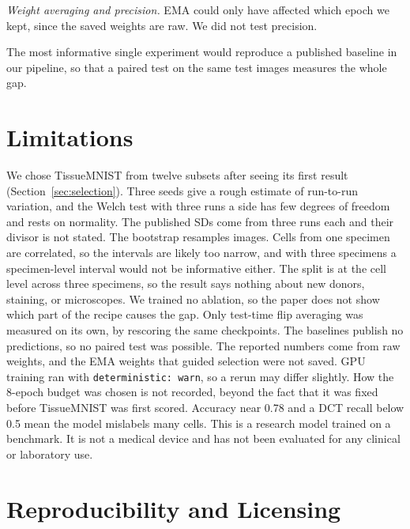 \documentclass[conference]{IEEEtran}
\begin{document}
\emph{Weight averaging and precision.} EMA could only have affected which epoch we kept,
since the saved weights are raw. We did not test precision.

The most informative single experiment would reproduce a published baseline in our
pipeline, so that a paired test on the same test images measures the whole gap.

\section{Limitations}
\label{sec:limits}

We chose TissueMNIST from twelve subsets after seeing its first result
(Section~\ref{sec:selection}). Three seeds give a rough estimate of run-to-run variation,
and the Welch test with three runs a side has few degrees of freedom and rests on
normality. The published SDs come from three runs each and their divisor is not stated.
The bootstrap resamples images. Cells from one specimen are correlated, so the intervals
are likely too narrow, and with three specimens a specimen-level interval would not be
informative either. The split is at the cell level across three specimens, so the result
says nothing about new donors, staining, or microscopes. We trained no ablation, so the paper
does not show which part of the recipe causes the gap. Only test-time flip averaging was
measured on its own, by rescoring the same checkpoints. The baselines publish no
predictions, so no paired test was possible. The reported numbers come from raw weights,
and the EMA weights that guided selection were not saved. GPU training ran with
\texttt{deterministic: warn}, so a rerun may differ slightly. How the 8-epoch budget was
chosen is not recorded, beyond the fact that it was fixed before TissueMNIST was first
scored. Accuracy near 0.78 and a DCT recall below 0.5 mean the model mislabels many cells.
This is a research model trained on a benchmark. It is not a medical device and has not
been evaluated for any clinical or laboratory use.

\section{Reproducibility and Licensing}
\label{sec:repro}
\end{document}
